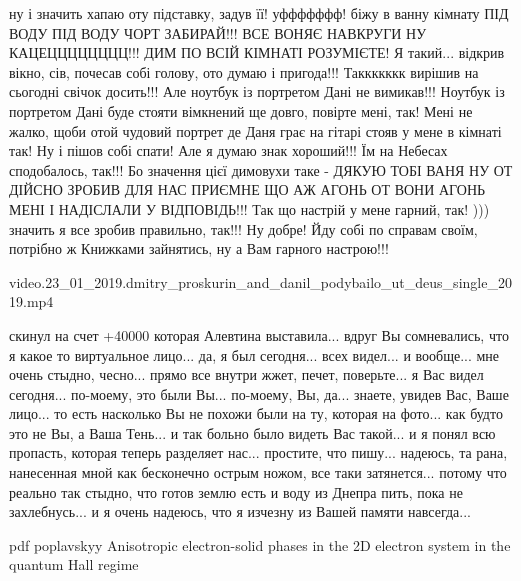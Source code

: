 ну і значить хапаю оту підставку, задув її! уффффффф! біжу в ванну кімнату ПІД
ВОДУ ПІД ВОДУ ЧОРТ ЗАБИРАЙ!!! ВСЕ ВОНЯЄ НАВКРУГИ НУ КАЦЕЦЦЦЦЦЦЦЦ!!! ДИМ ПО ВСІЙ
КІМНАТІ РОЗУМІЄТЕ!  Я такий... відкрив вікно, сів, почесав собі голову, ото
думаю і пригода!!! Таккккккк вирішив на сьогодні свічок досить!!! Але ноутбук
із портретом Дані не вимикав!!! Ноутбук із портретом Дані буде стояти вімкнений
ще довго, повірте мені, так! Мені не жалко, щоби отой чудовий портрет де Даня
грає на гітарі стояв у мене в кімнаті так! Ну і пішов собі спати! Але я думаю
знак хороший!!! Їм на Небесах сподобалось, так!!!  Бо значення цієї димовухи
таке - ДЯКУЮ ТОБІ ВАНЯ НУ ОТ ДІЙСНО ЗРОБИВ ДЛЯ НАС ПРИЄМНЕ ЩО АЖ АГОНЬ ОТ ВОНИ
АГОНЬ МЕНІ І НАДІСЛАЛИ У ВІДПОВІДЬ!!! Так що настрій у мене гарний, так! )))
значить я все зробив правильно, так!!! Ну добре! Йду собі по справам своїм, потрібно ж Книжками 
зайнятись, ну а Вам гарного настрою!!!

video.23_01_2019.dmitry_proskurin_and_danil_podybailo_ut_deus_single_2019.mp4


скинул на счет +40000 которая Алевтина выставила... вдруг Вы сомневались, что я
какое то виртуальное лицо... да, я был сегодня... всех видел... и вообще... мне
очень стыдно, чесно... прямо все внутри жжет, печет, поверьте... я Вас видел
сегодня... по-моему, это были Вы... по-моему, Вы, да... знаете, увидев Вас,
Ваше лицо... то есть насколько Вы не похожи были на ту, которая на фото... как
будто это не Вы, а Ваша Тень... и так больно было видеть Вас такой... и я понял
всю пропасть, которая теперь разделяет нас... простите, что пишу... надеюсь, та
рана, нанесенная мной как бесконечно острым ножом, все таки затянется... потому
что реально так стыдно, что готов землю есть и воду из Днепра пить, пока не
захлебнусь... и я очень надеюсь, что я изчезну из Вашей памяти навсегда...

pdf poplavskyy Anisotropic electron-solid phases in the 2D electron system in the quantum Hall regime
